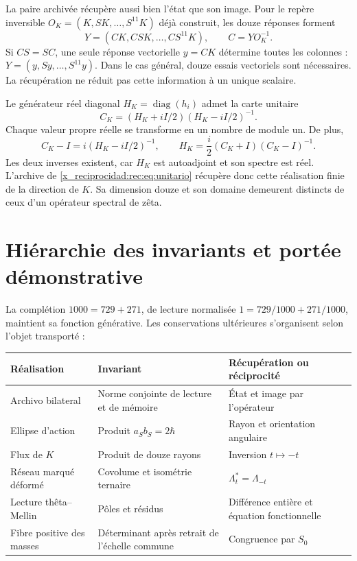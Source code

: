 La paire archivée récupère aussi bien l’état que son image. Pour le repère inversible \(O_K=(K,SK,\ldots,S^{11}K)\) déjà construit, les douze réponses forment
\[
 Y=(CK,CSK,\ldots,CS^{11}K),\qquad C=YO_K^{-1}.
\]
Si \(CS=SC\), une seule réponse vectorielle \(y=CK\) détermine toutes les colonnes : \(Y=(y,Sy,\ldots,S^{11}y)\). Dans le cas général, douze essais vectoriels sont nécessaires. La récupération ne réduit pas cette information à un unique scalaire.

Le générateur réel diagonal \(H_K=\operatorname{diag}(h_i)\) admet la carte unitaire
\[
 C_K=(H_K+iI/2)(H_K-iI/2)^{-1}.
\]
Chaque valeur propre réelle se transforme en un nombre de module un. De plus,
\[
 C_K-I=i(H_K-iI/2)^{-1},\qquad
 H_K=\frac i2(C_K+I)(C_K-I)^{-1}.
\]
Les deux inverses existent, car \(H_K\) est autoadjoint et son spectre est réel. L'archive de \eqref{x_reciprocidad:rec:eq:unitario} récupère donc cette réalisation finie de la direction de \(K\). Sa dimension douze et son domaine demeurent distincts de ceux d'un opérateur spectral de zêta.

\section{Hiérarchie des invariants et portée démonstrative}

La complétion \(1000=729+271\), de lecture normalisée \(1=729/1000+271/1000\), maintient sa fonction générative. Les conservations ultérieures s’organisent selon l’objet transporté :
\begin{center}
\small
\begin{tabularx}{\linewidth}{@{}p{.27\linewidth}Xp{.25\linewidth}@{}}
\toprule
Réalisation & Invariant & Récupération ou réciprocité\\
\midrule
Archivo bilateral & Norme conjointe de lecture et de mémoire & État et image par l’opérateur\\
Ellipse d’action & Produit \(a_Sb_S=2\hbar\) & Rayon et orientation angulaire\\
Flux de \(K\) & Produit de douze rayons & Inversion \(t\mapsto-t\)\\
Réseau marqué déformé & Covolume et isométrie ternaire & \(\Lambda_t^*=\Lambda_{-t}\)\\
Lecture thêta--Mellin & Pôles et résidus & Différence entière et équation fonctionnelle\\
Fibre positive des masses & Déterminant après retrait de l’échelle commune & Congruence par \(S_0\)\\
\bottomrule
\end{tabularx}
\end{center}

